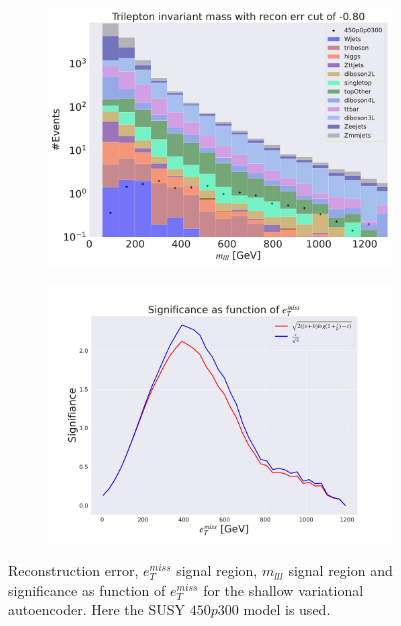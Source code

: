 \begin{figure}[H]
    \hfill
    \begin{subfigure}{.49\textwidth}
        \includegraphics[width=\textwidth]{Figures/VAE_testing/small/3lep/b_data_recon_big_rm3_feats_sig_450p0p0300_mlll_recon_errcut_-0.80.pdf}
        \caption{}
        \label{fig:VAE_3lep_small_mlll_450_2}
    \end{subfigure}
    \hfill   
    \begin{subfigure}{.49\textwidth}
        \includegraphics[width=\textwidth]{Figures/VAE_testing/small/3lep/significance_etmiss_450p0p0300_-0.7957779204248656.pdf}
        \caption{}
        \label{fig:VAE_3lep_small_signi_450_2}
    \end{subfigure}
    \hfill      
    \caption[3lep shallow network | $450p300$ | VAE | 2]{Reconstruction error, $e_T^{miss}$ signal region, $m_{lll}$ signal region and significance as function of 
    $e_T^{miss}$ for the shallow variational autoencoder. Here the SUSY $450p300$ model is used.}
    \label{fig:VAE_3lep_small_rec_sig_signi_450_2}
\end{figure}








